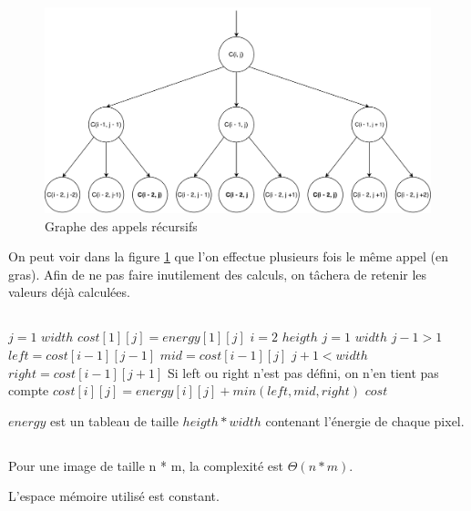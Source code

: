\subsection{} %
\begin{figure}[H]
	\centering
	\includegraphics[width=1\linewidth]{cost.pdf}
	\caption{Graphe des appels récursifs}
	\label{cost}
\end{figure}

On peut voir dans la figure \ref{cost} que l'on effectue plusieurs fois le même appel (en gras). Afin de ne pas faire inutilement des calculs, on tâchera de retenir les valeurs déjà calculées.

\subsection{} %
\begin{codebox}
\li \For $j = 1$ \To $width$
\Do
\li 	$cost[1][j] = energy[1][j]$
\End
\li \For $i = 2$ \To $heigth$
\Do 
\li 	\For $j = 1$ \To $width$
 		\Do
\li 		\If $j - 1> 1$
			\Do 
\li 			$left = cost[i - 1][j - 1]$
\End
\li 		$mid = cost[i - 1][j]$
\li 		\If $j + 1< width$
			\Do 
\li 			$right = cost[i - 1][j + 1]$
\End
\li \Comment Si left ou right n'est pas défini, on n'en tient pas compte
\li 		$cost[i][j] = energy[i][j] + min(left, mid, right)$
	\End
\End
\li \Return $cost$
\end{codebox}
$energy$ est un tableau de taille $heigth * width$ contenant l'énergie de chaque pixel.

\subsection{} %
Pour une image de taille n * m, la complexité est $\Theta(n * m)$.

L'espace mémoire utilisé est constant.

